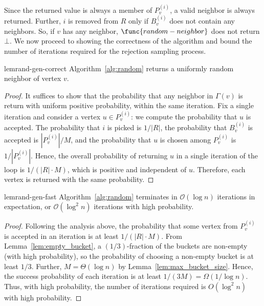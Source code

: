 Since the returned value is always a member of $P_v^{(i)}$,
a valid neighbor is always returned.
Further, $i$ is removed from $R$ only if $B_v^{(i)}$ does not contain any neighbors.
So, if $v$ has any neighbor, $\func{random-neighbor}$ does not return $\bot$.
We now proceed to showing the correctness of the algorithm and bound the number of iterations required for the rejection sampling process.
\begin{restatable}{lem}{rand-gen-correct}
\label{lem:rand_gen_correct}
Algorithm~\ref{alg:random} returns a uniformly random neighbor of vertex $v$.
\end{restatable}
\begin{proof}
It suffices to show that the probability that any neighbor in $\Gamma(v)$ is return with uniform positive probability, within the same iteration.
Fix a single iteration and consider a vertex $u\in P_v^{(i)}$:
we compute the probability that $u$ is accepted.
The probability that $i$ is picked is $1/|R|$, the probability that $B_v^{(i)}$ is accepted is $|P_v^{(i)}|/M$, and the probability that $u$ is chosen among $P_v^{(i)}$ is $1/|P_v^{(i)}|$.
Hence, the overall probability of returning $u$ in a single iteration
of the loop is $1/(|R|\cdot M)$, which is positive and independent of $u$.
Therefore, each vertex is returned with the same probability.
\end{proof}

\begin{restatable}{lem}{rand-gen-fast}
\label{lem:rand_gen_fast}
Algorithm~\ref{alg:random} terminates in $\mathcal{O}(\log n)$ iterations in expectation, or $\mathcal{O}(\log^2 n)$ iterations with high probability.
\end{restatable}
\begin{proof}
Following the analysis above, the probability that some vertex from $P_v^{(i)}$ is accepted in an iteration is at least $1/(|R|\cdot M)$. From Lemma~\ref{lem:empty_bucket}, a $(1/3)$-fraction of the buckets are non-empty (with high probability), so the probability of choosing a non-empty bucket is at least $1/3$. Further, $M = \Theta(\log n)$ by Lemma~\ref{lem:max_bucket_size}. Hence, the success probability of each iteration is at least $1/(3M)=\Omega(1/\log n)$. Thus, with high probability, the number of iterations required is  $O(\log^2 n)$ with high probability.
\end{proof}

